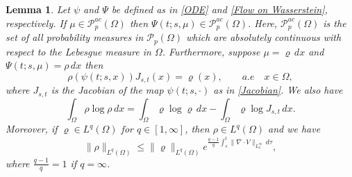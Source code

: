 \documentclass{amsart}
\newtheorem{lemma}[defn]{Lemma}
\numberwithin{equation}{section}
\begin{document}
\begin{lemma}\label{Lemma : density relation on the flow}\cite[Lemma~3.4]{KK-SIMA}
Let $\psi$ and $\Psi$ be defined as in \eqref{ODE} and \eqref{Flow on Wasserstein}, respectively. If $\mu \in \mathcal{P}_p^{ac}(\Omega)$ then
$\Psi(t;s,\mu)\in \mathcal{P}_p^{ac}(\Omega)$. Here, $ \mathcal{P}_p^{ac}(\Omega)$ is the set of all probability measures in $\mathcal{P}_p(\Omega)$ which are absolutely
continuous with respect to the {\it Lebesgue measure} in $\Omega$. Furthermore, suppose $\mu=\varrho \,dx$ and $\Psi(t;s,\mu)=\rho \,dx$ then
\begin{equation*}\label{Density relation}
\rho(\psi(t;s,x))J_{s,t}(x)=\varrho(x), \qquad a.e \quad x\in \Omega,
\end{equation*}
where $J_{s,t}$ is the Jacobian of the map $\psi(t;s,\cdot)$ as in \eqref{Jacobian}.
We also have
\begin{equation*}\label{Entropy relation} \int_{\Omega} \rho \log
\rho \,dx = \int_{\Omega}\varrho \log \varrho \,dx -
\int_{\Omega}\varrho \log J_{s,t}  \,dx.
\end{equation*}
Moreover, if $\varrho \in L^{q}(\Omega)$ for $q\in[1,\infty]$, then
${\rho}\in L^{q}(\Omega)$ and we have
\begin{equation*}\label{L^p relation}
\|{\rho}\|_{L^{q}(\Omega)} \leq
\|\varrho\|_{L^{q}(\Omega)}e^{\frac{q-1}{q}\int_s^t\|\nabla\cdot
V\|_{L^\infty_x} \,d\tau},
\end{equation*}
where $\frac{q-1}{q}=1$ if $q=\infty$.
\end{lemma}
\end{document}
